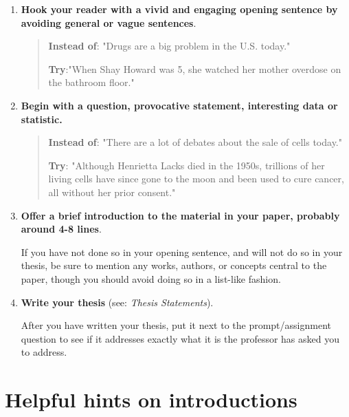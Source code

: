 \begin{enumerate}
\item \textbf{Hook your reader with a vivid and engaging opening sentence by avoiding 
general or vague sentences}.
        	               	        	
\begin{quote}

\textbf{Instead of}: "Drugs are a big problem in the U.S. today."

\textbf{Try}:"When Shay Howard was 5, she watched her mother
overdose on  the bathroom floor."
\end{quote}
        	    	
\item {\textbf{Begin with a question, provocative statement, interesting data or 
statistic.}}

\begin{quote}
                            	                   
\textbf{Instead of}: "There are a lot of debates about the sale of cells today."

\textbf{Try}: "Although Henrietta Lacks died in the 1950s, trillions
      of her living cells have since gone to the moon and  
      been used to cure cancer, all without her prior
      consent."     
\end{quote}
                    	 
\item \textbf{Offer a brief introduction to the material in your paper, probably around 
4-8 lines}. 

If you have not done so in your opening sentence, and will not do so in your thesis, be 
sure to mention any works, authors, or concepts central to the paper, though you 
should avoid doing so in a list-like fashion.
 
\item \textbf{Write your thesis} (see: \emph{Thesis Statements}).

After you have written your thesis, put it next to the prompt/assignment question to 
see if it addresses exactly what it is the professor has asked you to address.  
  
 \end{enumerate}

 
\section{Helpful hints on introductions}

